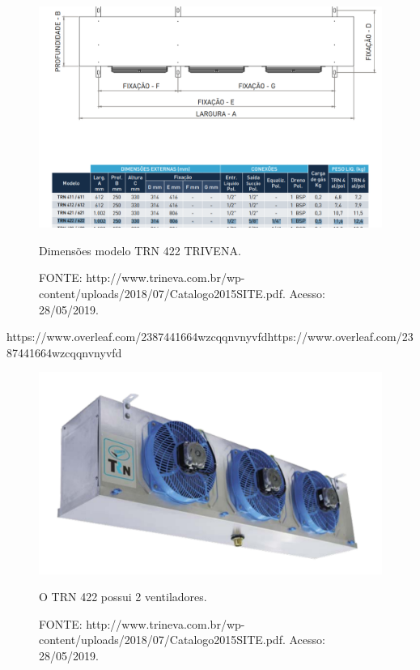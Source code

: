 \documentclass[10pt,a4paper]{article}
\begin{document}
\begin{figure}[H]
    \centering
    \includegraphics[scale = 0.7]{Figuras/Dimensoes_evap_sorv.png}
    \caption{Dimensões modelo TRN 422 TRIVENA.}
    \caption*{FONTE: http://www.trineva.com.br/wp-content/uploads/2018/07/Catalogo2015SITE.pdf. Acesso: 28/05/2019.}
    \label{evaporador_produto_final}
\end{figure}https://www.overleaf.com/2387441664wzcqqnvnyvfdhttps://www.overleaf.com/2387441664wzcqqnvnyvfd

\begin{figure}[H]
    \centering
    \includegraphics[scale = 0.5]{Figuras/Evap_sorve.PNG}
    \caption{O TRN 422 possui 2 ventiladores.}
    \caption*{FONTE: http://www.trineva.com.br/wp-content/uploads/2018/07/Catalogo2015SITE.pdf. Acesso: 28/05/2019.}
    \label{evaporador_produto_final}
\end{figure}

\end{document}
